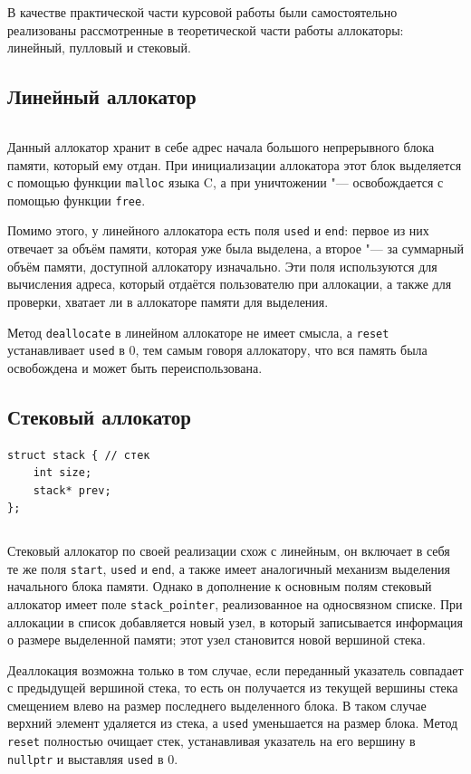 В качестве практической части курсовой работы были самостоятельно реализованы рассмотренные в теоретической части работы аллокаторы: линейный, пулловый и стековый.

\subsection*{Линейный аллокатор}
\small
\inputminted{cpp}{src/linear_allocator.h}
\normalsize

Данный аллокатор хранит в себе адрес начала большого непрерывного блока памяти, который ему отдан. При инициализации аллокатора этот блок выделяется с помощью функции \texttt{malloc} языка C, а при уничтожении "--- освобождается с помощью функции \texttt{free}.

Помимо этого, у линейного аллокатора есть поля \texttt{used} и \texttt{end}: первое из них отвечает за объём памяти, которая уже была выделена, а второе "--- за суммарный объём памяти, доступной аллокатору изначально. Эти поля используются для вычисления адреса, который отдаётся пользователю при аллокации, а также для проверки, хватает ли в аллокаторе памяти для выделения.

Метод \texttt{deallocate} в линейном аллокаторе не имеет смысла, а \texttt{reset} устанавливает \texttt{used} в $0$, тем самым говоря аллокатору, что вся память была освобождена и может быть переиспользована.

\subsection*{Стековый аллокатор}
\small
\begin{verbatim}
struct stack { // стек
	int size;
	stack* prev;
};
\end{verbatim}
\inputminted{cpp}{src/stack_allocator.h}
\normalsize

Стековый аллокатор по своей реализации схож с линейным, он включает в себя те же поля \texttt{start}, \texttt{used} и \texttt{end}, а также имеет аналогичный механизм выделения начального блока памяти. Однако в дополнение к основным полям стековый аллокатор имеет поле \texttt{stack\_pointer}, реализованное на односвязном списке. При аллокации в список добавляется новый узел, в который записывается информация о размере выделенной памяти; этот узел становится новой вершиной стека.

Деаллокация возможна только в том случае, если переданный указатель совпадает с предыдущей вершиной стека, то есть он получается из текущей вершины стека смещением влево на размер последнего выделенного блока. В таком случае верхний элемент удаляется из стека, а \texttt{used} уменьшается на размер блока. Метод \texttt{reset} полностью очищает стек, устанавливая указатель на его вершину в \texttt{nullptr} и выставляя \texttt{used} в $0$.

